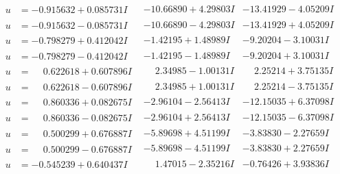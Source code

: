 \documentclass[1p]{elsarticle_modified}
\theoremstyle{definition}
\begin{document}
$$\begin{array}{c|c|c}
\begin{aligned}
u &= -0.915632 + 0.085731 I\end{aligned}
 & -10.66890 + 4.29803 I & -13.41929 - 4.05209 I \\ \hline\begin{aligned}
u &= -0.915632 - 0.085731 I\end{aligned}
 & -10.66890 - 4.29803 I & -13.41929 + 4.05209 I \\ \hline\begin{aligned}
u &= -0.798279 + 0.412042 I\end{aligned}
 & -1.42195 + 1.48989 I & -9.20204 - 3.10031 I \\ \hline\begin{aligned}
u &= -0.798279 - 0.412042 I\end{aligned}
 & -1.42195 - 1.48989 I & -9.20204 + 3.10031 I \\ \hline\begin{aligned}
u &= \phantom{-}0.622618 + 0.607896 I\end{aligned}
 & \phantom{-}2.34985 - 1.00131 I & \phantom{-}2.25214 + 3.75135 I \\ \hline\begin{aligned}
u &= \phantom{-}0.622618 - 0.607896 I\end{aligned}
 & \phantom{-}2.34985 + 1.00131 I & \phantom{-}2.25214 - 3.75135 I \\ \hline\begin{aligned}
u &= \phantom{-}0.860336 + 0.082675 I\end{aligned}
 & -2.96104 - 2.56413 I & -12.15035 + 6.37098 I \\ \hline\begin{aligned}
u &= \phantom{-}0.860336 - 0.082675 I\end{aligned}
 & -2.96104 + 2.56413 I & -12.15035 - 6.37098 I \\ \hline\begin{aligned}
u &= \phantom{-}0.500299 + 0.676887 I\end{aligned}
 & -5.89698 + 4.51199 I & -3.83830 - 2.27659 I \\ \hline\begin{aligned}
u &= \phantom{-}0.500299 - 0.676887 I\end{aligned}
 & -5.89698 - 4.51199 I & -3.83830 + 2.27659 I \\ \hline\begin{aligned}
u &= -0.545239 + 0.640437 I\end{aligned}
 & \phantom{-}1.47015 - 2.35216 I & -0.76426 + 3.93836 I \\ \hline\begin{aligned}

\end{aligned}
\end{array}$$
\end{document}
